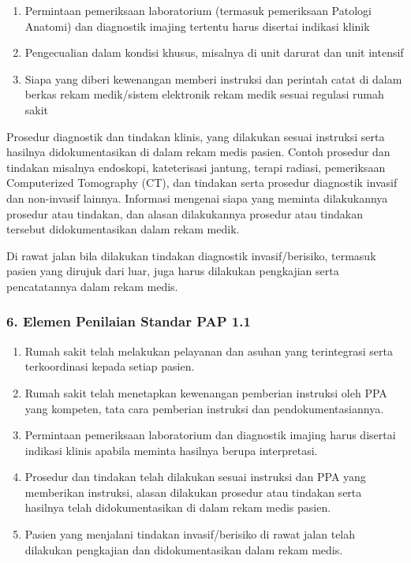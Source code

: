 \documentclass[
]{book}
\providecommand{\tightlist}{%
  \setlength{\itemsep}{0pt}\setlength{\parskip}{0pt}}
\begin{document}
\begin{enumerate}
\def\labelenumi{\alph{enumi}.}
\setcounter{enumi}{1}
\tightlist
\item
  Permintaan pemeriksaan laboratorium (termasuk pemeriksaan Patologi Anatomi) dan diagnostik imajing tertentu harus disertai indikasi klinik
\item
  Pengecualian dalam kondisi khusus, misalnya di unit darurat dan unit intensif
\item
  Siapa yang diberi kewenangan memberi instruksi dan perintah catat di dalam berkas rekam medik/sistem elektronik rekam medik sesuai regulasi rumah sakit
\end{enumerate}

Prosedur diagnostik dan tindakan klinis, yang dilakukan sesuai instruksi serta hasilnya didokumentasikan di dalam rekam medis pasien. Contoh prosedur dan tindakan misalnya endoskopi, kateterisasi jantung, terapi radiasi, pemeriksaan Computerized Tomography (CT), dan tindakan serta prosedur diagnostik invasif dan non-invasif lainnya. Informasi mengenai siapa yang meminta dilakukannya prosedur atau tindakan, dan alasan dilakukannya prosedur atau tindakan tersebut didokumentasikan dalam rekam medik.

Di rawat jalan bila dilakukan tindakan diagnostik invasif/berisiko, termasuk pasien yang dirujuk dari luar, juga harus dilakukan pengkajian serta pencatatannya dalam rekam medis.

\hypertarget{elemen-penilaian-standar-pap-1.1}{%
\subsubsection*{6. Elemen Penilaian Standar PAP 1.1}\label{elemen-penilaian-standar-pap-1.1}}

\begin{enumerate}
\def\labelenumi{\alph{enumi}.}
\tightlist
\item
  Rumah sakit telah melakukan pelayanan dan asuhan yang terintegrasi serta terkoordinasi kepada setiap pasien.
\item
  Rumah sakit telah menetapkan kewenangan pemberian instruksi oleh PPA yang kompeten, tata cara pemberian instruksi dan pendokumentasiannya.
\item
  Permintaan pemeriksaan laboratorium dan diagnostik imajing harus disertai indikasi klinis apabila meminta hasilnya berupa interpretasi.
\item
  Prosedur dan tindakan telah dilakukan sesuai instruksi dan PPA yang memberikan instruksi, alasan dilakukan prosedur atau tindakan serta hasilnya telah didokumentasikan di dalam rekam medis pasien.
\item
  Pasien yang menjalani tindakan invasif/berisiko di rawat jalan telah dilakukan pengkajian dan didokumentasikan dalam rekam medis.
\end{enumerate}
\end{document}
